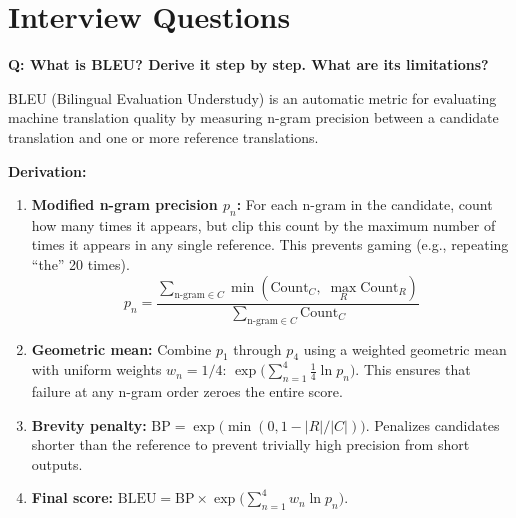 \section{Interview Questions}
\label{sec:eval_interview_questions}

\vspace{0.5em}

\begin{interviewq}
\textbf{Q: What is BLEU? Derive it step by step. What are its limitations?}

 \quad {} \quad \badgefreq{\freqhigh}

\stronganswer
BLEU (Bilingual Evaluation Understudy) is an automatic metric for evaluating
machine translation quality by measuring n-gram precision between a candidate
translation and one or more reference translations.

\textbf{Derivation:}
\begin{enumerate}
    \item \textbf{Modified n-gram precision $p_n$:} For each n-gram in the
          candidate, count how many times it appears, but clip this count by
          the maximum number of times it appears in any single reference.
          This prevents gaming (e.g., repeating ``the'' 20 times).
          \[
              p_n = \frac{\sum_{\text{n-gram} \in C}\min(\text{Count}_C,\;\max_R \text{Count}_R)}{\sum_{\text{n-gram} \in C}\text{Count}_C}
          \]

    \item \textbf{Geometric mean:} Combine $p_1$ through $p_4$ using a weighted
          geometric mean with uniform weights $w_n = 1/4$:
          $\exp\!\bigl(\sum_{n=1}^{4}\frac{1}{4}\ln p_n\bigr)$.
          This ensures that failure at any n-gram order zeroes the entire score.

    \item \textbf{Brevity penalty:}
          $\text{BP} = \exp\!\bigl(\min(0, 1 - |R|/|C|)\bigr)$.
          Penalizes candidates shorter than the reference to prevent trivially
          high precision from short outputs.

    \item \textbf{Final score:}
          $\text{BLEU} = \text{BP} \times \exp\!\bigl(\sum_{n=1}^{4}w_n \ln p_n\bigr)$.
\end{enumerate}


\end{interviewq}

